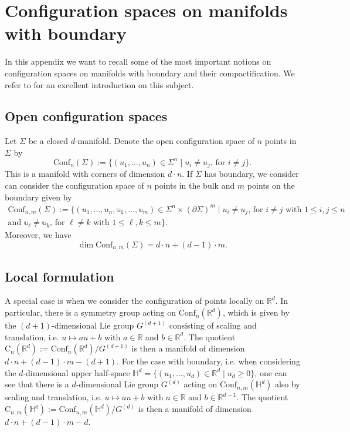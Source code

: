 \documentclass[11pt,colorinlistoftodos]{amsart}
\numberwithin{equation}{subsection}
\theoremstyle{plain}
\theoremstyle{definition}
\theoremstyle{remark}
\newcommand{\R}{\mathbb{R}}
\newcommand{\de}{\partial}
\begin{document}
\section{Configuration spaces on manifolds with boundary}
\label{app:configuration_spaces_on_manifolds_with_boundary}
In this appendix we want to recall some of the most important notions on configuration spaces on manifolds with boundary and their compactification. 
We refer to \cite{CamposIdrissiLambrechtsWillwacher2018,BottTaubes1994,Bott1996,Kontsevich1993_2} for an excellent introduction on this subject.

\subsection{Open configuration spaces}
Let $\Sigma$ be a closed $d$-manifold. Denote the open configuration space of $n$ points in $\Sigma$ by 
\begin{equation}
\label{eq:open_configuration_space}
\mathrm{Conf}_n(\Sigma):=\{(u_1,\ldots,u_n)\in \Sigma^n\mid u_i\not=u_j,\, \text{for $i\not=j$}\}.
\end{equation}
This is a manifold with corners of dimension $d\cdot n$. If $\Sigma$ has boundary, we consider can consider the configuration space of $n$ points in the bulk and $m$ points on the boundary given by 
\begin{multline}
\label{eq:open_configuration_space_boundary}
\mathrm{Conf}_{n,m}(\Sigma):=\{(u_1,\ldots,u_n,\mathbb{u_1},\ldots,\mathbb{u}_m)\in \Sigma^n\times (\de\Sigma)^m\mid u_i\not=u_j,\, \text{for $i\not=j$ with $1\leq i,j\leq n$} \\
\text{and }\mathbb{u}_\ell\not=\mathbb{u}_k,\, \text{for $\ell\not=k$ with $1\leq\ell,k\leq m$}\}.  
\end{multline}
Moreover, we have 
\[
\dim \mathrm{Conf}_{n,m}(\Sigma)=d\cdot n+(d-1)\cdot m. 
\]
\subsection{Local formulation} 
A special case is when we consider the configuration of points locally on $\R^d$. In particular, there is a symmetry group acting on $\mathrm{Conf}_n(\R^d)$, which is given by the $(d+1)$-dimensional Lie group $G^{(d+1)}$ consisting of scaling and translation, i.e. $u\mapsto au+b$ with $a\in\R$ and $b\in \R^d$. The quotient $\mathrm{C}_n(\R^d):=\mathrm{Conf}_n(\R^d)/G^{(d+1)}$ is then a manifold of dimension $d\cdot n+(d-1)\cdot m-(d+1)$. 
For the case with boundary, i.e. when considering the $d$-dimensional upper half-space $\mathbb{H}^d=\{(u_1,\ldots,u_d)\in\R^d\mid u_d\geq 0\}$, one can see that there is a $d$-dimensional Lie group $G^{(d)}$ acting on $\mathrm{Conf}_{n,m}(\mathbb{H}^d)$ also by scaling and translation, i.e. $u\mapsto au+b$ with $a\in\R$ and $b\in \R^{d-1}$. The quotient $\mathrm{C}_{n,m}(\mathbb{H^d}):=\mathrm{Conf}_{n,m}(\mathbb{H}^d)/G^{(d)}$ is then a manifold of dimension $d\cdot n+(d-1)\cdot m -d$.
\end{document}

